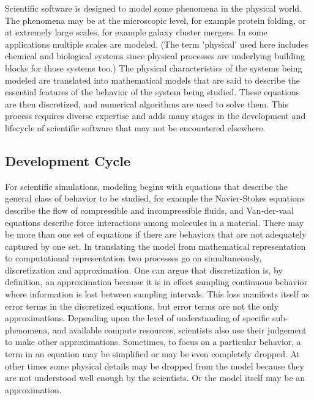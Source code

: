 \label{sec:lifecycle} 
Scientific software is designed to model some phenomena in the
physical world. The phenomena may be at the microscopic level, for example
protein folding, or at extremely large scales, for example galaxy cluster
mergers.  In some applications multiple scales are modeled.  (The term 'physical' used here includes chemical and
biological systems since physical processes are underlying building
blocks for those systems too.) The physical characteristics of the systems being modeled are
translated into mathematical models that are said to describe the
essential features of the behavior of the system being
studied. These equations are then discretized, and numerical algorithms
are used to solve them. This process requires diverse expertise and
adds many stages in the development and lifecycle of scientific
software that may not be encountered elsewhere. 


\subsection{Development Cycle}
\label{sec:dev-cycle}
For scientific simulations, modeling begins with equations that describe the
general class of behavior to be studied, for example the Navier-Stokes
equations describe the flow of compressible and incompressible
fluids, and Van-der-vaal equations describe force interactions among
molecules in a material. There may be more than one set of equations
if there are behaviors that are not adequately captured by one set.
In translating the model from mathematical representation to
computational representation two processes go on simultaneously,
discretization and approximation. One can argue that discretization is,
by definition, an approximation because it is in effect sampling
continuous behavior where information is lost between sampling
intervals. This loss manifests itself as error terms in the discretized
equations, but error terms are not the only
approximations. Depending upon the level of understanding of specific
sub-phenomena, and available compute resources, scientists also 
use their judgement to make other approximations. Sometimes, to focus on a
particular behavior, a term in an equation may be simplified or may be even completely
dropped. At other times some physical details may be dropped
from the model because they are not understood well enough by the
scientists.  Or the model itself may be an approximation.  

